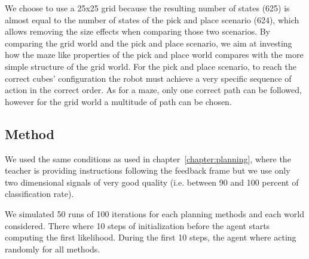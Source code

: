 We choose to use a 25x25 grid because the resulting number of states (625) is almost equal to the number of states of the pick and place scenario (624), which allows removing the size effects when comparing those two scenarios. By comparing the grid world and the pick and place scenario, we aim at investing how the maze like properties of the pick and place world compares with the more simple structure of the grid world. For the pick and place scenario, to reach the correct cubes' configuration the robot must achieve a very specific sequence of action in the correct order. As for a maze, only one correct path can be followed, however for the grid world a multitude of path can be chosen.


\subsection{Method}

We used the same conditions as used in chapter~\ref{chapter:planning}, where the teacher is providing instructions following the feedback frame but we use only two dimensional signals of very good quality (i.e. between 90 and 100 percent of classification rate).

We simulated 50 runs of 100 iterations for each planning methods and each world considered. There where 10 steps of initialization before the agent starts computing the first likelihood. During the first 10 steps, the agent where acting randomly for all methods.

